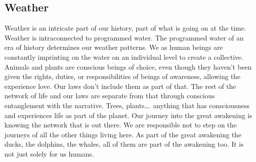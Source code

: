 \subsection{Weather}\label{weather}

Weather is an intricate part of our history, part of what is going on at
the time. Weather is intraconnected to programmed water. The programmed
water of an era of history determines our weather patterns. We as human
beings are constantly imprinting on the water on an individual level to
create a collective. Animals and plants are conscious beings of choice,
even though they haven't been given the rights, duties, or
responsibilities of beings of awareness, allowing the experience love.
Our laws don't include them as part of that. The rest of the network of
life and our laws are separate from that through conscious entanglement
with the narrative. Trees, plants\ldots{}. anything that has
consciousness and experiences life as part of the planet. Our journey
into the great awakening is knowing the network that is out there. We
are responsible not to step on the journeys of all the other things
living here. As part of the great awakening the ducks, the dolphins, the
whales, all of them are part of the awakening too. It is not just solely
for us humans.
